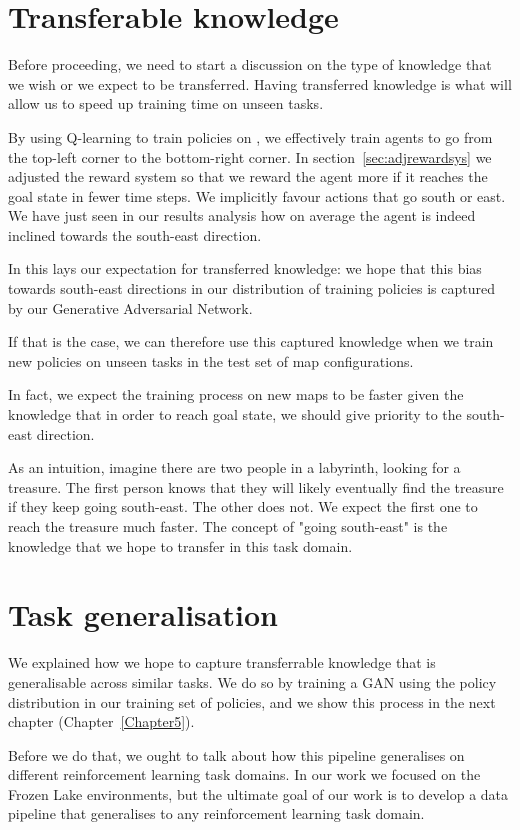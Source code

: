 \section{Transferable knowledge}
\label{sec:transferableknowledge}
Before proceeding, we need to start a discussion on the type of knowledge that we wish or we expect to be transferred. Having transferred knowledge is what will allow us to speed up training time on unseen tasks.

By using Q-learning to train policies on , we effectively train agents to go from the top-left corner to the bottom-right corner.
In section~\ref{sec:adjrewardsys} we adjusted the reward system so that we reward the agent more if it reaches the goal state in fewer time steps. We implicitly favour actions that go south or east. We have just seen in our results analysis how on average the agent is indeed inclined towards the south-east direction.

In this lays our expectation for transferred knowledge: we hope that this bias towards south-east directions in our distribution of training policies is captured by our Generative Adversarial Network.

If that is the case, we can therefore use this captured knowledge when we train new policies on unseen tasks in the test set of map configurations.

In fact, we expect the training process on new maps to be faster given the knowledge that in order to reach goal state, we should give priority to the south-east direction.

As an intuition, imagine there are two people in a labyrinth, looking for a treasure. The first person knows that they will likely eventually find the treasure if they keep going south-east. The other does not. We expect the first one to reach the treasure much faster. The concept of "going south-east" is the knowledge that we hope to transfer in this task domain.

\section{Task generalisation}
\label{sec:taskgeneralisation}
We explained how we hope to capture transferrable knowledge that is generalisable across similar tasks. We do so by training a GAN using the policy distribution in our training set of policies, and we show this process in the next chapter (Chapter~\ref{Chapter5}).

Before we do that, we ought to talk about how this pipeline generalises on different reinforcement learning task domains. In our work we focused on the Frozen Lake environments, but the ultimate goal of our work is to develop a data pipeline that generalises to any reinforcement learning task domain.

